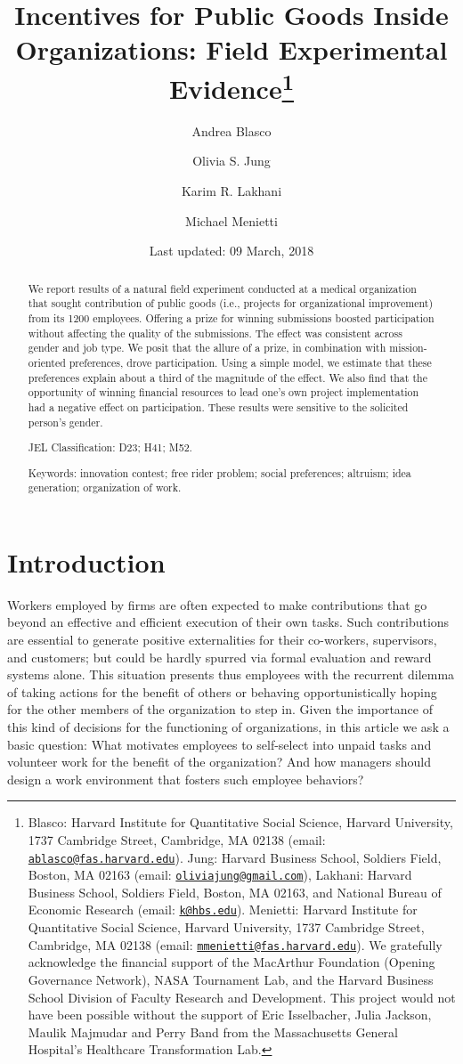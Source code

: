 \documentclass[11pt, titlepage]{article}
\title{Incentives for Public Goods Inside Organizations: Field Experimental
Evidence\thanks{Blasco: Harvard Institute for Quantitative Social Science, Harvard
University, 1737 Cambridge Street, Cambridge, MA 02138 (email:
\href{mailto:ablasco@fas.harvard.edu}{\nolinkurl{ablasco@fas.harvard.edu}}).
Jung: Harvard Business School, Soldiers Field, Boston, MA 02163 (email:
\href{mailto:oliviajung@gmail.com}{\nolinkurl{oliviajung@gmail.com}}),
Lakhani: Harvard Business School, Soldiers Field, Boston, MA 02163, and
National Bureau of Economic Research (email:
\href{mailto:k@hbs.edu}{\nolinkurl{k@hbs.edu}}). Menietti: Harvard
Institute for Quantitative Social Science, Harvard University, 1737
Cambridge Street, Cambridge, MA 02138 (email:
\href{mailto:mmenietti@fas.harvard.edu}{\nolinkurl{mmenietti@fas.harvard.edu}}).
We gratefully acknowledge the financial support of the MacArthur
Foundation (Opening Governance Network), NASA Tournament Lab, and the
Harvard Business School Division of Faculty Research and Development.
This project would not have been possible without the support of Eric
Isselbacher, Julia Jackson, Maulik Majmudar and Perry Band from the
Massachusetts General Hospital's Healthcare Transformation Lab.}}
\author{Andrea Blasco \and Olivia S. Jung \and Karim R. Lakhani \and Michael Menietti}
\date{Last updated: 09 March, 2018}
\begin{document}
\maketitle
\begin{abstract}
We report results of a natural field experiment conducted at a medical
organization that sought contribution of public goods (i.e., projects
for organizational improvement) from its 1200 employees. Offering a
prize for winning submissions boosted participation without affecting
the quality of the submissions. The effect was consistent across gender
and job type. We posit that the allure of a prize, in combination with
mission-oriented preferences, drove participation. Using a simple model,
we estimate that these preferences explain about a third of the
magnitude of the effect. We also find that the opportunity of winning
financial resources to lead one's own project implementation had a
negative effect on participation. These results were sensitive to the
solicited person's gender.

\smallskip\noindent 
JEL Classification: D23; H41; M52.

\smallskip\noindent 
Keywords: innovation contest; free rider problem; social preferences; altruism; idea generation; organization of work.
\end{abstract}


\clearpage
\tableofcontents
\setcounter{tocdepth}{2}
\clearpage

\section{Introduction}\label{introduction}

Workers employed by firms are often expected to make contributions that
go beyond an effective and efficient execution of their own tasks. Such
contributions are essential to generate positive externalities for their
co-workers, supervisors, and customers; but could be hardly spurred via
formal evaluation and reward systems alone. This situation presents thus
employees with the recurrent dilemma of taking actions for the benefit
of others or behaving opportunistically hoping for the other members of
the organization to step in. Given the importance of this kind of
decisions for the functioning of organizations, in this article we ask a
basic question: What motivates employees to self-select into unpaid
tasks and volunteer work for the benefit of the organization? And how
managers should design a work environment that fosters such employee
behaviors?
\end{document}
